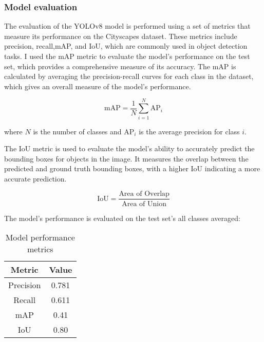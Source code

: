 \subsubsection{Model evaluation}\label{subsubsec:model-evaluation}
The evaluation of the YOLOv8 model is performed using a set of metrics that measure its performance on the Cityscapes dataset.
These metrics include precision, recall,mAP, and IoU, which are commonly used in object detection tasks.
I used the mAP metric to evaluate the model's performance on the test set, which provides a comprehensive measure of its accuracy.
The mAP is calculated by averaging the precision-recall curves for each class in the dataset, which gives an overall measure of the model's performance.

\[
\text{mAP} = \frac{1}{N} \sum_{i=1}^{N} \text{AP}_i
\]

where \( N \) is the number of classes and \( \text{AP}_i \) is the average precision for class \( i \).

The IoU metric is used to evaluate the model's ability to accurately predict the bounding boxes for objects in the image.
It measures the overlap between the predicted and ground truth bounding boxes, with a higher IoU indicating a more accurate prediction.

\[
\text{IoU} = \frac{\text{Area of Overlap}}{\text{Area of Union}}
\]

The model's performance is evaluated on the test set's all classes averaged:
\begin{table}[h!]
\centering
\begin{tabular}{|c|c|}
\hline
\textbf{Metric} & \textbf{Value} \\
\hline
Precision & 0.781 \\
\hline
Recall & 0.611 \\
\hline
mAP & 0.41 \\
\hline
IoU & 0.80 \\
\hline
\end{tabular}
\caption{Model performance metrics}
\label{tab:model-performance-metrics}
\end{table}
